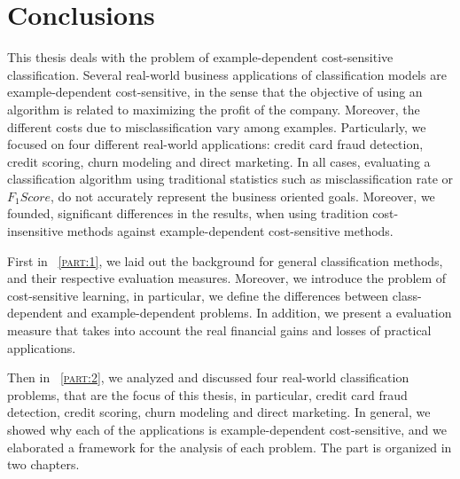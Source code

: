 \chapter{Conclusions}\label{ch:10}

This thesis deals with the problem of example-dependent cost-sensitive classification.
Several real-world business applications of classification models are example-dependent 
cost-sensitive, in the sense that the objective of using an algorithm is related to maximizing the 
profit of the company. Moreover, the different costs due to misclassification vary among examples. 
Particularly, we focused on four different real-world applications: credit card fraud 
detection, credit scoring, churn modeling and direct marketing. In all cases, evaluating a 
classification algorithm using traditional statistics such as misclassification rate or $F_1Score$, 
do not accurately represent the business oriented goals. Moreover, we founded, significant 
differences in the results, when using tradition cost-insensitive methods against example-dependent 
cost-sensitive methods.

First in \partname{~\textsc{\ref{part:1}}}, we laid out the background for general classification 
methods, and their respective evaluation measures. Moreover, we introduce the problem of 
cost-sensitive learning, in particular, we define the differences between class-dependent and 
example-dependent problems. In addition, we present a evaluation measure that takes into account 
the real financial gains and losses of practical applications.

Then in \partname{~\textsc{\ref{part:2}}}, we analyzed and discussed four real-world 
classification problems, that are the focus of this thesis, in particular, credit card fraud 
detection, credit scoring, churn modeling and direct marketing. In general, we showed why each of 
the applications is example-dependent cost-sensitive, and we elaborated a framework for the 
analysis of each problem. The part is organized in two chapters.

